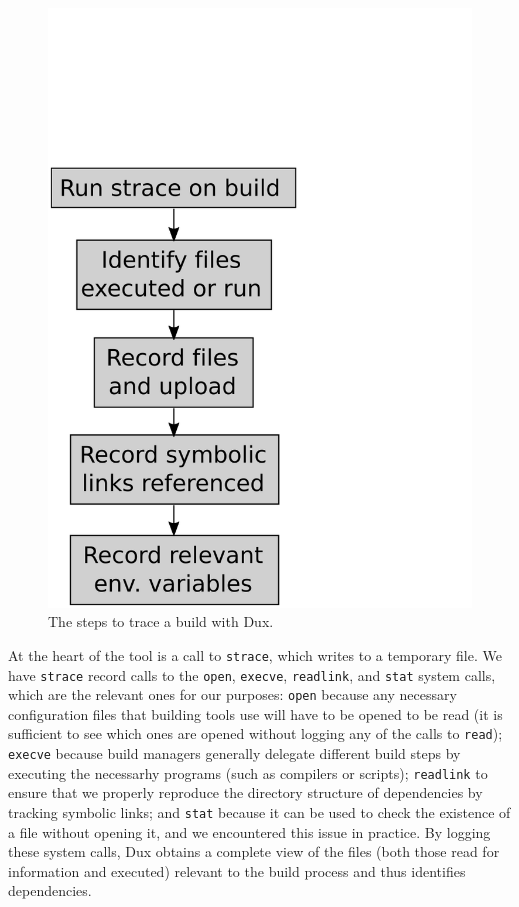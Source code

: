 \documentclass[10pt,conference]{IEEEtran}
\begin{document}
\begin{figure}
\includegraphics[width=\columnwidth]{duxtrace}
\caption{The steps to trace a build with Dux.}
\end{figure}

At the heart of the tool is a call to \texttt{strace}, which writes to a temporary file. We have \texttt{strace}
record calls to the \texttt{open}, \texttt{execve}, \texttt{readlink}, and \texttt{stat} system calls,
which are the relevant
ones for our purposes: \texttt{open} because any necessary configuration files that building tools use will
have to be opened to be read (it is sufficient to see which ones are opened without logging any of the
calls to \texttt{read}); \texttt{execve} because build managers generally delegate different build steps by
executing the necessarhy programs (such as compilers or scripts); \texttt{readlink} to ensure that we
properly reproduce the directory structure of dependencies by tracking symbolic links; and \texttt{stat} because
it can be used to check the existence of a file without opening it, and we encountered this issue in practice.
By logging these system
calls, Dux obtains a complete view of the files (both those read for information and executed) relevant to the
build process and thus identifies dependencies.
\end{document}
